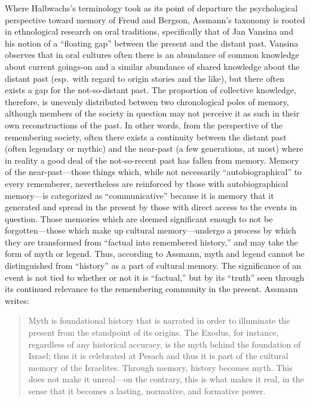 Where Halbwachs's terminology took as its point of departure the
psychological perspective toward memory of
Freud\autocite{terdiman_radstone-schwarz2011} and
Bergson\autocite{ansellpearson_radstone-schwarz2011}, Assmann's taxonomy
is rooted in ethnological research on oral traditions, specifically that
of Jan Vansina and his notion of a ``floating gap'' between the present
and the distant past.\autocite{vansina1985} Vansina observes that in
oral cultures often there is an abundance of common knowledge about
current goings-on and a similar abundance of shared knowledge about the
distant past (esp.~with regard to origin stories and the like), but
there often exists a gap for the not-so-distant past. The proportion of
collective knowledge, therefore, is unevenly distributed between two
chronological poles of memory, although members of the society in
question may not perceive it as such in their own reconstructions of the
past.\autocites[23--24]{vansina1985}[As Assmann, observes, ``In the
cultural memory of a group, both levels of the past merge seamlessly
into one another.''][35]{assmann2011} In other words, from the
perspective of the remembering society, often there exists a continuity
between the distant past (often legendary or mythic) and the near-past
(a few generations, at most) where in reality a good deal of the
not-so-recent past has fallen from memory. Memory of the
near-past---those things which, while not necessarily
``autobiographical'' to every rememberer, nevertheless are reinforced by
those with autobiographical memory---is categorized as ``communicative''
because it is memory that it generated and spread in the present by
those with direct access to the events in question. Those memories which
are deemed significant enough to not be forgotten---those which make up
cultural memory---undergo a process by which they are transformed from
``factual into remembered history,'' and may take the form of myth or
legend.\autocite[37--38]{assmann2011} Thus, according to Assmann, myth
and legend cannot be distinguished from ``history'' as a part of
cultural memory. The significance of an event is not tied to whether or
not it is ``factual,'' but by its ``truth'' seen through its continued
relevance to the remembering community in the present. Assmann writes:

\begin{quote}
Myth is foundational history that is narrated in order to illuminate the
present from the standpoint of its origins. The Exodus, for instance,
regardless of any historical accuracy, is the myth behind the foundation
of Israel; thus it is celebrated at Pesach and thus it is part of the
cultural memory of the Israelites. Through memory, history becomes myth.
This does not make it unreal---on the contrary, this is what makes it
real, in the sense that it becomes a lasting, normative, and formative
power.\autocite[38]{assmann2011}
\end{quote}


